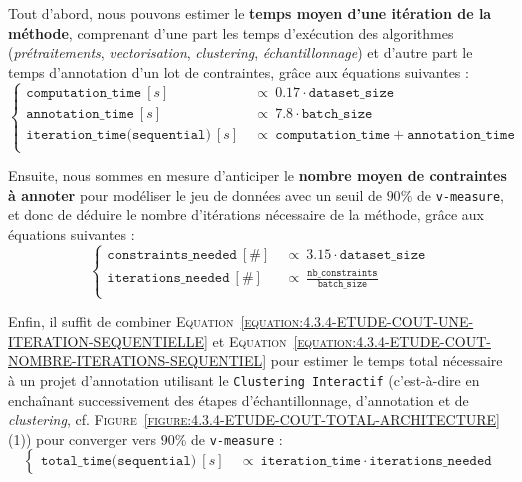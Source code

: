			Tout d'abord, nous pouvons estimer le \textbf{temps moyen d'une itération de la méthode}, comprenant d'une part les temps d'exécution des algorithmes (\textit{prétraitements}, \textit{vectorisation}, \textit{clustering}, \textit{échantillonnage}) et d'autre part le temps d'annotation d'un lot de contraintes, grâce aux équations suivantes :
			\begin{equation}
				\label{equation:4.3.4-ETUDE-COUT-UNE-ITERATION-SEQUENTIELLE}
				\begin{cases}
					\texttt{computation\_time}~[s]&
						~\propto~0.17 \cdot \texttt{dataset\_size}\\
					\texttt{annotation\_time}~[s]&
						~\propto~7.8 \cdot \texttt{batch\_size} \\
					\texttt{iteration\_time(sequential)}~[s]&
						~\propto~\texttt{computation\_time} + \texttt{annotation\_time} \\
				\end{cases}
			\end{equation}
			
			Ensuite, nous sommes en mesure d'anticiper le \textbf{nombre moyen de contraintes à annoter} pour modéliser le jeu de données avec un seuil de $90$\% de \texttt{v-measure}, et donc de déduire le nombre d'itérations nécessaire de la méthode, grâce aux équations suivantes :
			\begin{equation}
				\label{equation:4.3.4-ETUDE-COUT-NOMBRE-ITERATIONS-SEQUENTIEL}
				\begin{cases}
					\texttt{constraints\_needed}~[\#] &
						~\propto~3.15 \cdot \texttt{dataset\_size} \\
					\texttt{iterations\_needed}~[\#] &
						~\propto~\frac{\texttt{nb\_constraints}}{\texttt{batch\_size}} \\
				\end{cases}
			\end{equation}
			
			Enfin, il suffit de combiner \textsc{Equation~\ref{equation:4.3.4-ETUDE-COUT-UNE-ITERATION-SEQUENTIELLE}} et \textsc{Equation~\ref{equation:4.3.4-ETUDE-COUT-NOMBRE-ITERATIONS-SEQUENTIEL}} pour estimer le temps total nécessaire à un projet d'annotation utilisant le \texttt{Clustering Interactif} (c'est-à-dire en enchaînant successivement des étapes d'échantillonnage, d'annotation et de \textit{clustering}, cf. \textsc{Figure~\ref{figure:4.3.4-ETUDE-COUT-TOTAL-ARCHITECTURE}} (1)) pour converger vers $90$\% de \texttt{v-measure} :
			\begin{equation}
				\label{equation:4.3.4-ETUDE-COUT-TOTAL-SEQUENTIEL}
				\begin{cases}
					\texttt{total\_time(sequential)}~[s] &
						~\propto~\texttt{iteration\_time} \cdot \texttt{iterations\_needed}
				\end{cases}
			\end{equation}
			
